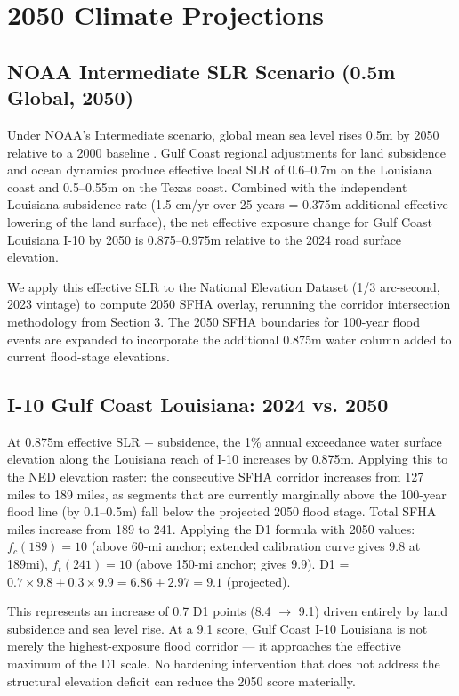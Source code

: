 \section{2050 Climate Projections}
\label{sec:projections}

\subsection{NOAA Intermediate SLR Scenario (0.5m Global, 2050)}

Under NOAA's Intermediate scenario, global mean sea level rises 0.5m by 2050 relative
to a 2000 baseline \citep{NOAA_SLR2022}. Gulf Coast regional adjustments for land
subsidence and ocean dynamics produce effective local SLR of 0.6--0.7m on the Louisiana
coast and 0.5--0.55m on the Texas coast. Combined with the independent Louisiana
subsidence rate (1.5 cm/yr over 25 years = 0.375m additional effective lowering of the
land surface), the net effective exposure change for Gulf Coast Louisiana I-10 by 2050
is 0.875--0.975m relative to the 2024 road surface elevation.

We apply this effective SLR to the National Elevation Dataset (1/3 arc-second, 2023
vintage) to compute 2050 SFHA overlay, rerunning the corridor intersection methodology
from Section 3. The 2050 SFHA boundaries for 100-year flood events are expanded to
incorporate the additional 0.875m water column added to current flood-stage elevations.

\subsection{I-10 Gulf Coast Louisiana: 2024 vs. 2050}

At 0.875m effective SLR + subsidence, the 1\% annual exceedance water surface elevation
along the Louisiana reach of I-10 increases by 0.875m. Applying this to the NED elevation
raster: the consecutive SFHA corridor increases from 127 miles to 189 miles, as segments
that are currently marginally above the 100-year flood line (by 0.1--0.5m) fall below
the projected 2050 flood stage. Total SFHA miles increase from 189 to 241. Applying
the D1 formula with 2050 values: $f_c(189) = 10$ (above 60-mi anchor; extended calibration
curve gives 9.8 at 189mi), $f_t(241) = 10$ (above 150-mi anchor; gives 9.9). D1 =
$0.7 \times 9.8 + 0.3 \times 9.9 = 6.86 + 2.97 = 9.1$ (projected).

This represents an increase of 0.7 D1 points (8.4 $\to$ 9.1) driven entirely by land
subsidence and sea level rise. At a 9.1 score, Gulf Coast I-10 Louisiana is not merely
the highest-exposure flood corridor --- it approaches the effective maximum of the D1
scale. No hardening intervention that does not address the structural elevation deficit
can reduce the 2050 score materially.

